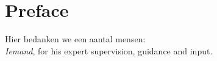 \chapter*{Preface}
Hier bedanken we een aantal mensen: \\

\emph{Iemand}, for his expert supervision, guidance and input.\\